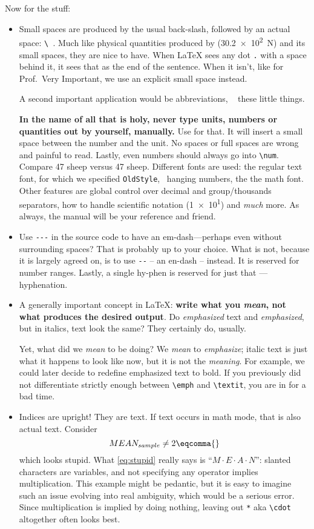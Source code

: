 Now for the stuff:
\begin{itemize}
	\item Small spaces are produced by the usual back-slash, followed by an actual space: \verb|\ |.
	Much like physical quantities produced by  (\SI{30.2e2}{\newton}) and its small spaces, they are nice to have.
	When \LaTeX{} sees any dot \verb|.| with a space behind it, it sees that as the end of the sentence.
	When it isn't, like for Prof.\ Very Important, we use an explicit small space instead.
	
	A second important application would be abbreviations, \ \textleftarrow{} these little things.
	
	\textbf{In the name of all that is holy, never type units, numbers or quantities out by yourself, manually.}
	Use  for that.
	It will insert a small space between the number and the unit.
	No spaces or full spaces are wrong and painful to read.
	Lastly, even numbers should always go into \verb|\num|.
	Compare 47 sheep versus \num{47} sheep.
	Different fonts are used: the regular text font, for which we specified \verb|OldStyle|, \ hanging numbers, the the math font.
	Other features are global control over decimal and group/thousands separators, how to handle scientific notation (\num{1e1}) and \emph{much} more.
	As always, the manual will be your reference and friend.
	\item Use \verb|---| in the source code to have an em-dash---perhaps even without surrounding spaces?
	That is probably up to your choice.
	What is not, because it is largely agreed on, is to use \verb|--| -- an en-dash -- instead.
	It is reserved for number ranges.
	Lastly, a single hy-phen is reserved for just that --- hyphenation.
	\item A generally important concept in \LaTeX{}:
	\textbf{write what you \emph{mean}, not what produces the desired output}.
	Do \emph{emphasized} text and \textit{emphasized}, but in italics, text look the same?
	They certainly do, usually.
	
	Yet, what did we \emph{mean} to be doing?
	We \emph{mean} to \emph{emphasize}; italic text is just what it happens to look like now, but it is not the \emph{meaning}.
	For example, we could later decide to redefine emphasized text to bold.
	If you previously did not differentiate strictly enough between \verb|\emph| and \verb|\textit|, you are in for a bad time.
	\item Indices are upright!
	They are text.
	If text occurs in math mode, that is also actual text.
	Consider
	\begin{equation}\label{eq:stupid}
		MEAN_{sample} \neq 2\eqcomma{}
	\end{equation}
	which looks stupid.
	What \cref{eq:stupid} really says is \enquote{\(M \cdot E \cdot A \cdot N\)}: slanted characters are variables, and not specifying any operator implies multiplication.
	This example might be pedantic, but it is easy to imagine such an issue evolving into real ambiguity, which would be a serious error.
	Since multiplication is implied by doing nothing, leaving out \verb|*| aka \verb|\cdot| altogether often looks best.
	

\end{itemize}
